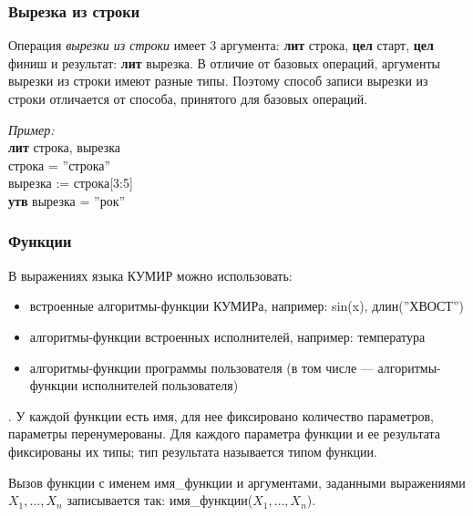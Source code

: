 \subsubsection{Вырезка из строки}

Операция \emph{вырезки из строки} имеет 3 аргумента: \textsf{\textbf{лит} строка, \textbf{цел} старт, \textbf{цел} финиш} и результат: \textsf{\textbf{лит} вырезка}. В отличие от базовых операций, аргументы вырезки из строки имеют разные типы. Поэтому способ записи вырезки из строки отличается от способа, принятого для базовых операций.

	\emph{Пример:}\\
{\sffamily
		\textbf{лит} строка, вырезка\\
		строка = ''строка''\\
		вырезка  := строка[3:5]\\
		\textbf{утв} вырезка = ''рок''
}
 
\subsubsection{Функции}

		В выражениях языка КУМИР можно использовать:  
\begin{itemize}
\item встроенные алгоритмы-функции КУМИРа, например: \textsf{sin(x)}, \textsf{длин(''ХВОСТ'')}
\item алгоритмы-функции встроенных исполнителей, например: \textsf{температура}
\item алгоритмы-функции программы пользователя (в том числе --- алгоритмы-функции исполнителей пользователя)
\end{itemize}
.
	У каждой функции есть имя, для нее фиксировано количество параметров, параметры перенумерованы. Для каждого параметра функции и ее результата фиксированы их типы; тип результата называется типом функции.

	Вызов функции с именем \textsf{имя\_функции} и аргументами, заданными выражениями\linebreak $X_1, \dots, X_n$ записывается так:
\textsf{имя\_функции($X_1, \dots, X_n$)}.

